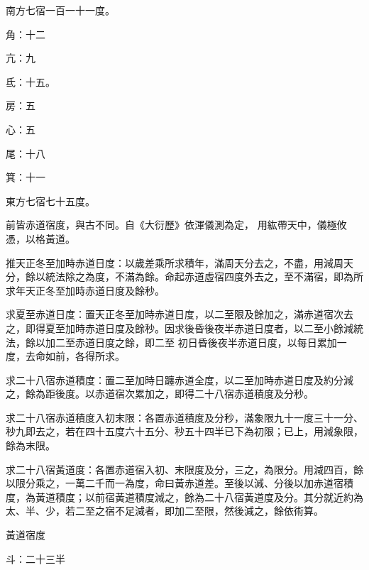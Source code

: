 \begin{pinyinscope}
 南方七宿一百一十一度。



 角：十二



 亢：九



 氐：十五。



 房：五



 心：五



 尾：十八



 箕：十一



 東方七宿七十五度。



 前皆赤道宿度，與古不同。自《大衍歷》依渾儀測為定，
 用紘帶天中，儀極攸憑，以格黃道。



 推天正冬至加時赤道日度：以歲差乘所求積年，滿周天分去之，不盡，用減周天分，餘以統法除之為度，不滿為餘。命起赤道虛宿四度外去之，至不滿宿，即為所求年天正冬至加時赤道日度及餘秒。



 求夏至赤道日度：置天正冬至加時赤道日度，以二至限及餘加之，滿赤道宿次去之，即得夏至加時赤道日度及餘秒。因求後昏後夜半赤道日度者，以二至小餘減統法，餘以加二至赤道日度之餘，即二至
 初日昏後夜半赤道日度，以每日累加一度，去命如前，各得所求。



 求二十八宿赤道積度：置二至加時日躔赤道全度，以二至加時赤道日度及約分減之，餘為距後度。以赤道宿次累加之，即得二十八宿赤道積度及分秒。



 求二十八宿赤道積度入初末限：各置赤道積度及分秒，滿象限九十一度三十一分、秒九即去之，若在四十五度六十五分、秒五十四半已下為初限；已上，用減象限，餘為末限。



 求二十八宿黃道度：各置赤道宿入初、末限度及分，三之，為限分。用減四百，餘以限分乘之，一萬二千而一為度，命曰黃赤道差。至後以減、分後以加赤道宿積度，為黃道積度；以前宿黃道積度減之，餘為二十八宿黃道度及分。其分就近約為太、半、少，若二至之宿不足減者，即加二至限，然後減之，餘依術算。



 黃道宿度



 斗：二十三半




\end{pinyinscope}
